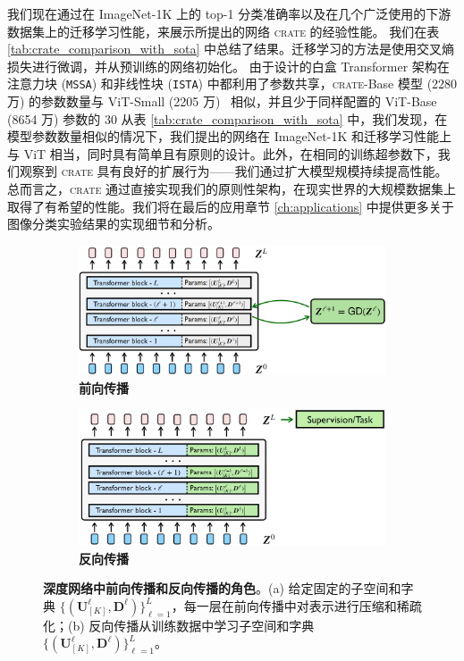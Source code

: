 \documentclass[../../book-main.tex]{subfiles}
\begin{document}
我们现在通过在 ImageNet-1K 上的 top-1 分类准确率以及在几个广泛使用的下游数据集上的迁移学习性能，来展示所提出的网络 \textsc{crate} 的经验性能。
我们在表 \ref{tab:crate_comparison_with_sota} 中总结了结果。迁移学习的方法是使用交叉熵损失进行微调，并从预训练的网络初始化。
由于设计的白盒 Transformer 架构在注意力块 (\texttt{MSSA}) 和非线性块 (\texttt{ISTA}) 中都利用了参数共享，\textsc{crate}{-Base} 模型 (2280 万)
的参数数量与 ViT-Small (2205 万)~\cite{dosovitskiy2020image} 相似，并且少于同样配置的 ViT-Base (8654 万) 参数的 30%
从表 \ref{tab:crate_comparison_with_sota} 中，我们发现，在模型参数数量相似的情况下，我们提出的网络在 ImageNet-1K 和迁移学习性能上与 ViT 相当，同时具有简单且有原则的设计。此外，在相同的训练超参数下，我们观察到 \textsc{crate} 具有良好的扩展行为——我们通过扩大模型规模持续提高性能。总而言之，\textsc{crate} 通过直接实现我们的原则性架构，在现实世界的大规模数据集上取得了有希望的性能。我们将在最后的应用章节 \ref{ch:applications} 中提供更多关于图像分类实验结果的实现细节和分析。

\begin{figure}[t]
    \begin{subfigure}[t]{0.48\textwidth}
        \centering
        \includegraphics[width=\textwidth]{figs_chap4/forward.png}
        \caption{\bf 前向传播}
    \end{subfigure}
    \hfill
    \begin{subfigure}[t]{0.48\textwidth}
        \centering
        \includegraphics[width=\textwidth]{figs_chap4/backward.png}
        \caption{\bf 反向传播}
    \end{subfigure}
    \caption{\small {\bf 深度网络中前向传播和反向传播的角色}。(a) 给定固定的子空间和字典 $\{(\bm U_{[K]}^{\ell}, \bm D^{\ell})\}_{\ell=1}^L$，每一层在前向传播中对表示进行压缩和稀疏化；(b) 反向传播从训练数据中学习子空间和字典 $\{(\bm U_{[K]}^{\ell}, \bm D^{\ell})\}_{\ell=1}^L$。}
    \label{fig:forward-backward}
\end{figure}
\end{document}
